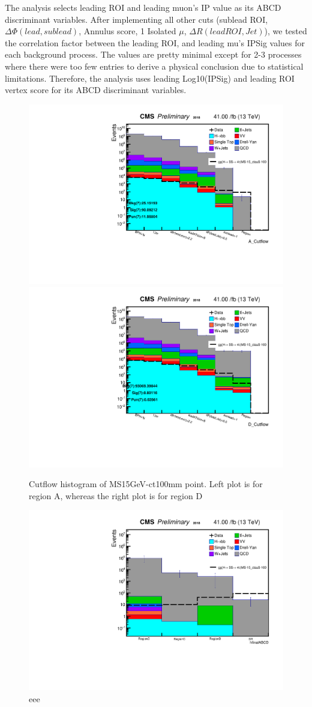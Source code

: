 The analysis selects leading ROI and leading muon's IP value as its ABCD discriminant variables.
After implementing all other cuts (sublead ROI, $\Delta\Phi(lead,sublead)$, Annulus score, 1 Isolated $\mu$, $\Delta R(lead ROI, Jet)$), we tested the correlation factor between the leading ROI, and leading mu's IPSig values for each background process.
The values are pretty minimal except for 2-3 processes where there were too few entries to derive a physical conclusion due to statistical limitations.
Therefore, the analysis uses leading Log10(IPSig) and leading ROI vertex score for its ABCD discriminant variables.


 \begin{figure}[h!]
   \caption{Cutflow histogram of MS15GeV-ct100mm point. Left plot is for region A, whereas the right plot is for region D}
   \label{fig:ABmethod}
   \centering
   \includegraphics[width=0.47\linewidth]{figs/AnalysisNoteplot_MS-15_ctauS-100_A_Cutflow.pdf}
   \includegraphics[width=0.47\linewidth]{figs/AnalysisNoteplot_MS-15_ctauS-100_D_Cutflow.pdf}
 \end{figure}

 \begin{figure}[h!]
   \caption{eee}
   \label{fig:ABCDmethod}
   \centering
   \includegraphics[width=0.67\linewidth]{figs/AnalysisNoteplot_MS-15_ctauS-100_hfinalABCD.pdf}
 \end{figure}

